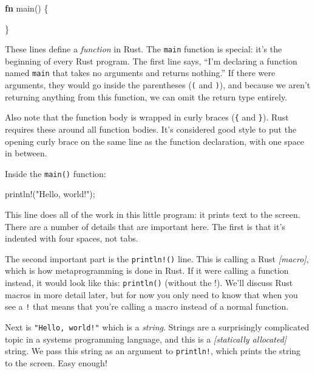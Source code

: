 \documentclass[a4paper,]{book}
\newenvironment{Shaded}{\begin{snugshade}}{\end{snugshade}}
\newcommand{\KeywordTok}[1]{\textcolor[rgb]{0.13,0.29,0.53}{\textbf{{#1}}}}
\newcommand{\StringTok}[1]{\textcolor[rgb]{0.31,0.60,0.02}{{#1}}}
\newcommand{\OtherTok}[1]{\textcolor[rgb]{0.56,0.35,0.01}{{#1}}}
\newcommand{\NormalTok}[1]{{#1}}
\begin{document}
\begin{Shaded}
\begin{Highlighting}[]
\KeywordTok{fn} \NormalTok{main() \{}

\NormalTok{\}}
\end{Highlighting}
\end{Shaded}

These lines define a \emph{function} in Rust. The \texttt{main} function
is special: it's the beginning of every Rust program. The first line
says, ``I'm declaring a function named \texttt{main} that takes no
arguments and returns nothing.'' If there were arguments, they would go
inside the parentheses (\texttt{(} and \texttt{)}), and because we
aren't returning anything from this function, we can omit the return
type entirely.

Also note that the function body is wrapped in curly braces (\texttt{\{}
and \texttt{\}}). Rust requires these around all function bodies. It's
considered good style to put the opening curly brace on the same line as
the function declaration, with one space in between.

Inside the \texttt{main()} function:

\begin{Shaded}
\begin{Highlighting}[]
    \OtherTok{println!}\NormalTok{(}\StringTok{"Hello, world!"}\NormalTok{);}
\end{Highlighting}
\end{Shaded}

This line does all of the work in this little program: it prints text to
the screen. There are a number of details that are important here. The
first is that it's indented with four spaces, not tabs.

The second important part is the \texttt{println!()} line. This is
calling a Rust \emph{{[}macro{]}}, which is how metaprogramming is done
in Rust. If it were calling a function instead, it would look like this:
\texttt{println()} (without the !). We'll discuss Rust macros in more
detail later, but for now you only need to know that when you see a
\texttt{!} that means that you're calling a macro instead of a normal
function.

Next is \texttt{"Hello,\ world!"} which is a \emph{string}. Strings are
a surprisingly complicated topic in a systems programming language, and
this is a \emph{{[}statically allocated{]}} string. We pass this string
as an argument to \texttt{println!}, which prints the string to the
screen. Easy enough!
\end{document}
